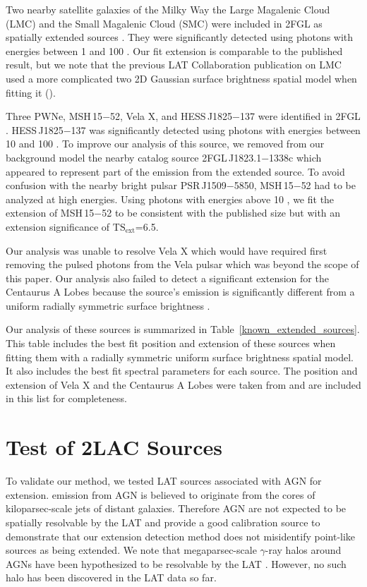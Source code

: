 \documentclass[12pt,preprint]{aastex}
\newcommand{\gev}{\text{GeV}\xspace}
\newcommand{\tsext}{{\ensuremath{\text{TS}_{\text{ext}}}}\xspace}
\begin{document}
Two nearby satellite galaxies of the Milky Way the Large Magalenic Cloud (LMC)
and the Small Magalenic
Cloud (SMC) were included in 2FGL as spatially extended sources \citep{lmc,smc}.  They were significantly
detected using photons with energies between
1 \gev and 100 \gev. Our
fit extension is comparable to the published result, but we note that
the previous LAT Collaboration publication on LMC used a more complicated two 2D Gaussian surface
brightness spatial model when fitting it (\citep{lmc}).

Three PWNe, MSH\,15$-$52, Vela X, and HESS\,J1825$-$137 were
identified in 2FGL \citep{msh1552,velax,fermi_hess_j1825}.  
HESS\,J1825$-$137 was significantly detected using photons
with energies between 10 \gev and 100 \gev.
To improve our analysis of this source, we removed from our background model the
nearby catalog source 2FGL\,J1823.1$-$1338c which appeared to
represent part of the emission from the extended source.
To avoid confusion with the nearby bright pulsar PSR\,J1509$-$5850, MSH\,15$-$52 had
to be
analyzed at high energies.  Using photons with energies above 10 \gev,
we fit the extension of MSH\,15$-$52 to be consistent with the published
size but with an extension significance of \tsext=6.5.  

Our analysis was unable to resolve Vela X which would have required first
removing the pulsed photons from the Vela pulsar which was beyond the
scope of this paper.  Our analysis also failed to detect a significant
extension for the Centaurus A Lobes because
the source's emission is significantly different from a uniform
radially symmetric surface brightness \citep{cen_a_lat}.

Our analysis of these sources is summarized in
Table~\ref{known_extended_sources}.  This table includes the best fit
position and extension of these sources when fitting them 
with a radially symmetric uniform surface brightness spatial model. It also
includes the best fit spectral parameters for each source.  The position
and extension of Vela X and the Centaurus A Lobes were taken from
\cite{velax,cen_a_lat} and are included in this list for completeness.

\section{Test of 2LAC Sources}
\label{test_2lac_sources}

To validate our method, we tested LAT sources associated with AGN for
extension.  \gev emission from AGN is believed to originate from the
cores of kiloparsec-scale jets of distant galaxies.  Therefore AGN are
not expected to be spatially resolvable by the LAT and provide a good
calibration source to demonstrate that our extension detection method
does not misidentify point-like sources as being extended.  We note that
megaparsec-scale $\gamma$-ray halos around AGNs have been hypothesized
to be resolvable by the LAT \citep{pair_halo_paper}. However, no such
halo has been discovered in the LAT data so far.
\end{document}
